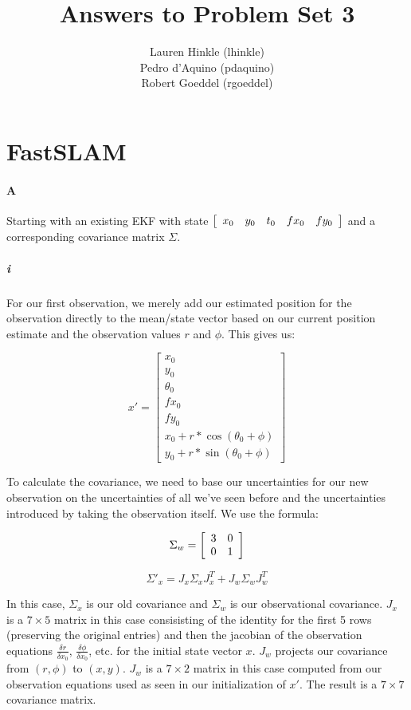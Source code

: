 \documentclass[12pt]{article}
\title{Answers to Problem Set 3}
\author{
	Lauren Hinkle (lhinkle)\\
	Pedro d'Aquino (pdaquino)\\
	Robert Goeddel (rgoeddel)}
\begin{document}
\maketitle
\pagebreak

\section{FastSLAM}

\paragraph{A}
Starting with an existing EKF with state $\left[\begin{array}{c c c c c}x_0 & y_0 & t_0 & fx_0 & fy_0\end{array}\right]$ and a corresponding covariance matrix $\Sigma$.
\subparagraph{i}
For our first observation, we merely add our estimated position for the observation
directly to the mean/state vector based on our current position estimate and the
observation values $r$ and $\phi$. This gives us:

$$x' = \left[\begin{array}{c}x_0 \\
        y_0 \\
        \theta_0 \\
        fx_0 \\
        fy_0 \\
        x_0 + r * \cos (\theta_0 + \phi) \\
        y_0 + r * \sin (\theta_0 + \phi)
        \end{array}\right]
$$

To calculate the covariance, we need to base our uncertainties for our new observation
on the uncertainties of all we've seen before and the uncertainties introduced by taking
the observation itself. We use the formula:

$$\Sigma_w = \left[\begin{array}{c c}
    3 & 0 \\
    0 & 1 \end{array}\right]
$$

$$\Sigma'_x = J_x \Sigma_x J_x^T + J_w \Sigma_w J_w^T$$

In this case, $\Sigma_x$ is our old covariance and $\Sigma_w$ is our observational covariance.
$J_x$ is a $7 \times 5$ matrix in this case consisisting of the identity for the first 5 rows (preserving
the original entries) and then the jacobian of the observation equations $\frac{\delta r}{\delta x_0}$,
$\frac{\delta \phi}{\delta x_0}$, etc. for the initial state vector $x$. $J_w$ projects our covariance
from $(r,\phi)$ to $(x,y)$. $J_w$ is a $7 \times 2$ matrix in this case computed from our observation equations
used as seen in our initialization of $x'$. The result is a $7 \times 7$ covariance matrix.
\end{document}
